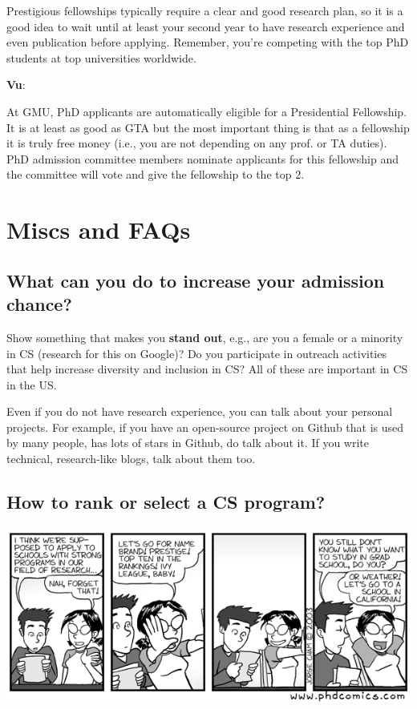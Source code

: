\documentclass[11pt]{article}
\newenvironment{commentbox}[1][]{
\small
    \begin{cbox}
    \textbf{#1}: 
 }{
   \end{cbox}
}
\begin{document}
Prestigious fellowships typically require a clear and good research plan, so it is a good idea to wait until at least your second year to have research experience and even publication before applying. Remember, you're competing with the top PhD students at top universities worldwide. 


\begin{commentbox}[Vu]
At GMU, PhD applicants are automatically eligible for a Presidential Fellowship.  It is at least as good as GTA but the most important thing is that as a fellowship it is truly free money (i.e., you are not depending on any prof. or TA duties).  PhD admission committee members nominate applicants for this fellowship and the committee will vote and give the fellowship to the top 2.
\end{commentbox}


\section{Miscs and FAQs}

\subsection{What can you do to increase your admission chance?}

 Show something that makes you \textbf{stand out}, e.g., are you a female or a minority in CS (research for this on Google)? Do you participate in outreach activities that help increase diversity and inclusion in CS?  All of these are important in CS in the US.
    
Even if you do not have research experience, you can talk about your personal projects. For example, if you have an open-source project on Github that is used by many people, has lots of stars in Github, do talk about it. If you write technical, research-like blogs, talk about them too.

\subsection{How to rank or select a CS program?}
   \begin{center}
    \includegraphics[scale=0.4]{c1.png}
   \end{center}
\end{document}

